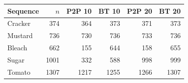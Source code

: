 \begin{tabular}{@{}lrrrrr@{}}
\toprule
Sequence & $n$ & P2P 10 & BT 10 & P2P 20 & BT 20 \\
\midrule
Cracker & 374 & 364 & 373 & 371 & 373 \\
Mustard & 736 & 730 & 736 & 733 & 736 \\
Bleach & 662 & 155 & 644 & 158 & 655 \\
Sugar & 1001 & 332 & 588 & 998 & 999 \\
Tomato & 1307 & 1217 & 1255 & 1266 & 1307 \\
\bottomrule
\end{tabular}
